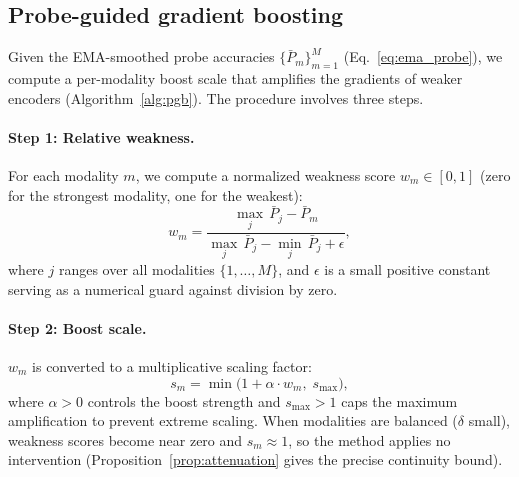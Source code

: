 \documentclass{article}
\begin{document}
\subsection{Probe-guided gradient boosting}
\label{sec:boost}

Given the EMA-smoothed probe accuracies $\{\bar{P}_m\}_{m=1}^{M}$ (Eq.~\ref{eq:ema_probe}), we compute a per-modality boost scale that amplifies the gradients of weaker encoders (Algorithm~\ref{alg:pgb}). The procedure involves three steps.

\paragraph{Step 1: Relative weakness.}
For each modality $m$, we compute a normalized weakness score $w_m \in [0,1]$ (zero for the strongest modality, one for the weakest):
%
\begin{equation}
\label{eq:weakness}
w_m = \frac{\max_j\,\bar{P}_j - \bar{P}_m}{\max_j\,\bar{P}_j - \min_j\,\bar{P}_j + \epsilon},
\end{equation}
%
where $j$ ranges over all modalities $\{1, \ldots, M\}$, and $\epsilon$ is a small positive constant serving as a numerical guard against division by zero.

\paragraph{Step 2: Boost scale.}
$w_m$ is converted to a multiplicative scaling factor:
%
\begin{equation}
\label{eq:boost_scale}
s_m = \min\!\bigl(1 + \alpha \cdot w_m,\; s_{\max}\bigr),
\end{equation}
%
where $\alpha > 0$ controls the boost strength and $s_{\max} > 1$ caps the maximum amplification to prevent extreme scaling. When modalities are balanced ($\delta$ small), weakness scores become near zero and $s_m \approx 1$, so the method applies no intervention (Proposition~\ref{prop:attenuation} gives the precise continuity bound).
\end{document}
